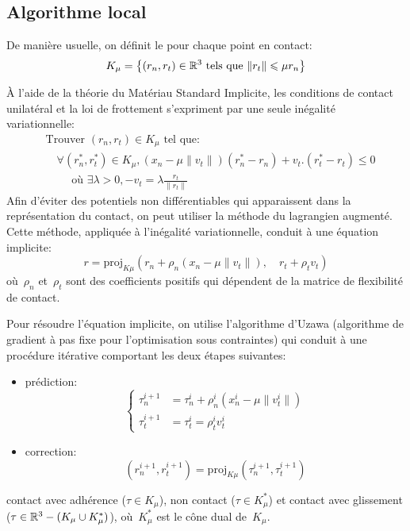 \medskip
\subsection{Algorithme local}
De manière usuelle, on définit le  pour chaque point
en contact:
\begin{equation} K_\mu = \left\{ (r_n, r_t) \in \mathbb R^3 \text{ tels que } \|r_t\| \leqslant \mu r_n \right\} \end{equation}

À l'aide de la théorie du Matériau Standard Implicite, les conditions de contact unilatéral et la
loi de frottement s'expriment par une seule inégalité variationnelle:
\begin{equation}
\begin{aligned}
&\text{Trouver } (r_n, r_t) \in K_\mu \text{ tel que: }\\
&\quad\forall (r_n^*, r_t^*) \in K_\mu, (x_n - \mu \|v_t\|) (r_n^* - r_n) + v_t.(r_t^* - r_t) \le 0\\
&\quad\quad\text{ où } \exists\lambda>0, - v_t = \lambda \frac{r_t}{\|r_t\|}
\end{aligned}
\end{equation}
\medskipvm
Afin d'éviter des potentiels non différentiables qui apparaissent dans la représentation du contact,
on peut utiliser la méthode du lagrangien augmenté.
Cette méthode, appliquée à l'inégalité variationnelle, conduit à une équation implicite:
\begin{equation} r = \mathrm{proj}_{K\mu} (r_n + \rho_n(x_n - \mu \|v_t\|), \quad r_t + \rho_t v_t) \end{equation}
où~$\rho_n$ et~$\rho_t$ sont des coefficients positifs qui dépendent de la matrice de flexibilité
de contact.

Pour résoudre l'équation implicite, on utilise l'algorithme d'Uzawa
(algorithme de gradient à pas fixe pour l'optimisation sous contraintes) qui conduit à une procédure
itérative comportant les deux étapes suivantes:
\begin{itemize}
  \item prédiction:
  \begin{equation}\left\{\begin{aligned}
	\tau_n^{i+1}&=\tau_n^i+\rho_n^i(x_n^i-\mu\|v_t^i\|)\\
	\tau_t^{i+1}&=\tau_t^i=\rho_t^iv_t^i
	\end{aligned}\right.\end{equation}
  \item correction:
  \begin{equation}(r_n^{i+1},r_t^{i+1}) = \mathrm{proj}_{K\mu}(\tau_ n^{i+1}, \tau_t^{i+1})\end{equation}
\end{itemize}
contact avec adhérence ($\tau\in K_\mu$), non contact ($\tau\in K_\mu^*$) et contact avec
glissement ($\tau\in\mathbb R^3- (K_\mu \cup K_\mu^*)$), où~$K_\mu^*$ est le cône dual de~$K_\mu$.


